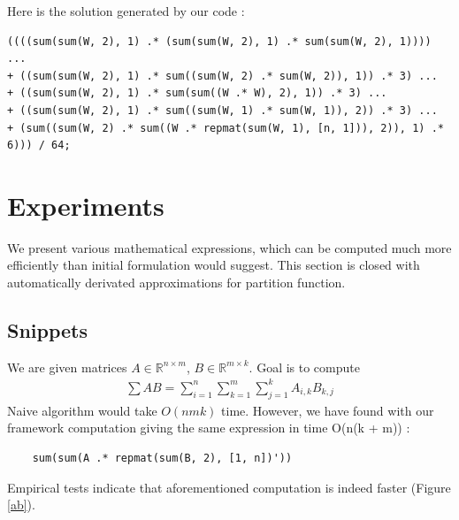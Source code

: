 \documentclass{article}
\begin{document}
Here is the solution generated by our code : 

\begingroup
    \fontsize{8pt}{12pt}\selectfont
\begin{verbatim}
((((sum(sum(W, 2), 1) .* (sum(sum(W, 2), 1) .* sum(sum(W, 2), 1)))) ...
+ ((sum(sum(W, 2), 1) .* sum((sum(W, 2) .* sum(W, 2)), 1)) .* 3) ...
+ ((sum(sum(W, 2), 1) .* sum(sum((W .* W), 2), 1)) .* 3) ...
+ ((sum(sum(W, 2), 1) .* sum((sum(W, 1) .* sum(W, 1)), 2)) .* 3) ...
+ (sum((sum(W, 2) .* sum((W .* repmat(sum(W, 1), [n, 1])), 2)), 1) .* 6))) / 64;
\end{verbatim}
\endgroup


\section{Experiments}

We present various mathematical expressions, which can be computed much more efficiently
than initial formulation would suggest. This section is closed with automatically derivated
approximations for partition function. 

\subsection{Snippets}

We are given matrices $A \in \mathbb{R}^{n \times m}$, $B \in \mathbb{R}^{m \times k}$. 
Goal is to compute 
\begin{align*}
	\sum AB = \sum_{i = 1}^n \sum_{k = 1}^m \sum_{j = 1}^k A_{i, k} B_{k, j} 
\end{align*}
Naive algorithm would take $O(nmk)$ time. However, we have found with our framework 
computation giving the same expression in time O(n(k + m)) :

\begin{verbatim}
	sum(sum(A .* repmat(sum(B, 2), [1, n])'))
\end{verbatim}

Empirical tests indicate that aforementioned computation is indeed faster (Figure \ref{ab}).
\end{document}
